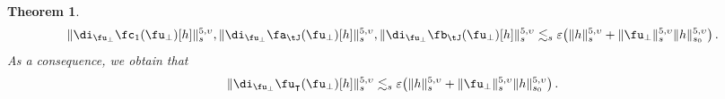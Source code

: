 \documentclass[a4paper,reqno,10pt]{article}
\newtheorem{theo}{Theorem}[section]
\begin{document}
\begin{theo}
\begin{equation}
	\| \di_{\fu_{\perp}}\fc_{1}(\fu_{\perp}) [h] \|_{s}^{5,\upsilon}, \| \di_{\fu_{\perp}}\fa_{\tJ}(\fu_{\perp}) [h] \|_{s}^{5,\upsilon} , \| \di_{\fu_{\perp}}\fb_{\tJ}(\fu_{\perp}) [h] \|_{s}^{5,\upsilon} \lesssim_{s} \varepsilon\big(  \| h\|_{s}^{5,\upsilon}  +  \| \fu_{\perp}\|_{s}^{5,\upsilon}   \| h\|_{s_0}^{5,\upsilon}  \big)\,.
\end{equation}
As a consequence, we obtain that
\begin{equation}
	\| \di_{\fu_{\perp}} \fu_{\intercal}(\fu_{\perp})[h] \|_{s}^{5,\upsilon} \lesssim_{s} \varepsilon \big(  \| h\|_{s}^{5,\upsilon}  +  \| \fu_{\perp}\|_{s}^{5,\upsilon}   \| h\|_{s_0}^{5,\upsilon}  \big)\,.
\end{equation}
\end{theo}
\end{document}
